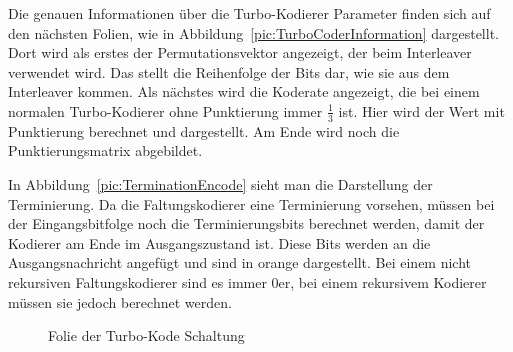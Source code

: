 Die genauen Informationen über die Turbo-Kodierer Parameter finden sich auf den nächsten Folien, wie in Abbildung~\ref{pic:TurboCoderInformation} dargestellt. Dort wird als erstes der Permutationsvektor angezeigt, der beim Interleaver verwendet wird. Das stellt die Reihenfolge der Bits dar, wie sie aus dem Interleaver kommen. Als nächstes wird die Koderate angezeigt, die bei einem normalen Turbo-Kodierer ohne Punktierung immer $\frac{1}{3}$ ist. Hier wird der Wert mit Punktierung berechnet und dargestellt. Am Ende wird noch die Punktierungsmatrix abgebildet. 

In Abbildung~\ref{pic:TerminationEncode} sieht man die Darstellung der Terminierung. Da die Faltungskodierer eine Terminierung vorsehen, müssen bei der Eingangsbitfolge noch die Terminierungsbits berechnet werden, damit der Kodierer am Ende im Ausgangszustand ist. Diese Bits werden an die Ausgangsnachricht angefügt und sind in orange dargestellt. Bei einem nicht rekursiven Faltungskodierer sind es immer 0er, bei einem rekursivem Kodierer müssen sie jedoch berechnet werden.

\begin{figure}[th]
\centering
{}
\caption{Folie der Turbo-Kode Schaltung}
\label{pic:TurboEncode}
\end{figure}
	
